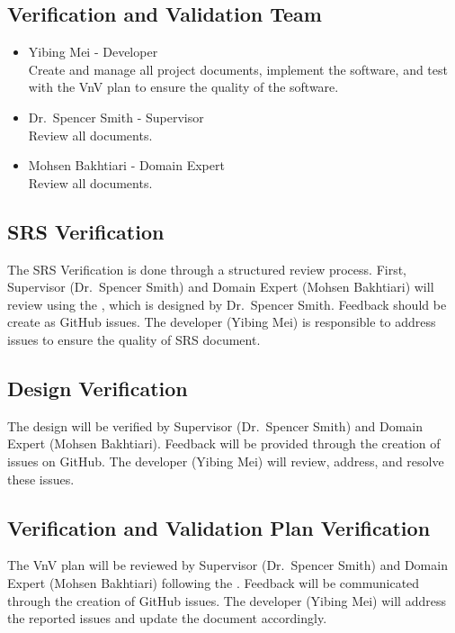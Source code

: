 \documentclass[12pt, titlepage]{article}
\begin{document}
\subsection{Verification and Validation Team} \label{vnv_team}

\begin{itemize}
\item Yibing Mei - Developer \\
Create and manage all project documents, implement the software, and test with 
the VnV plan to ensure the quality of the software.

\item Dr.\ Spencer Smith - Supervisor \\
Review all documents.

\item Mohsen Bakhtiari - Domain Expert \\
Review all documents.
\end{itemize}

\subsection{SRS Verification} \label{srs_verif}

The SRS Verification is done through a structured review process. First, 
Supervisor (Dr.\ Spencer Smith) and Domain Expert (Mohsen Bakhtiari) will review 
using the \citet{SRSChecklist}, which is designed by Dr.\ Spencer Smith. Feedback 
should be create as GitHub issues. The developer (Yibing Mei) is responsible to 
address issues to ensure the quality of SRS document.

\subsection{Design Verification} \label{design_verif}

The design will be verified by Supervisor (Dr.\ Spencer Smith) and Domain 
Expert (Mohsen Bakhtiari). Feedback will be provided through the creation of 
issues on GitHub. The developer (Yibing Mei) will review, address, and resolve 
these issues.

\subsection{Verification and Validation Plan Verification} \label{vnv_verif}

The VnV plan will be reviewed by Supervisor (Dr.\ Spencer Smith) and Domain 
Expert (Mohsen Bakhtiari) following the \citet{VnVChecklist}. Feedback will be 
communicated through the creation of GitHub issues. The developer (Yibing Mei) 
will address the reported issues and update the document accordingly.
\end{document}
